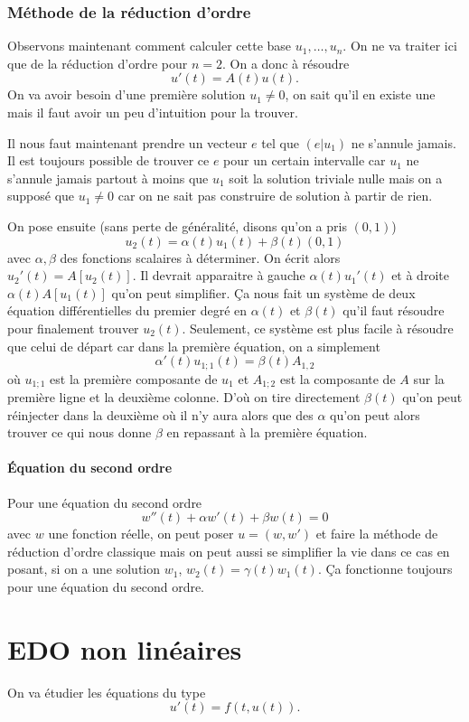 \subsubsection{Méthode de la réduction d'ordre}
\label{sec:redordre}
Observons maintenant comment calculer cette base $u_1,\ldots,u_n$.
On ne va traiter ici que de la réduction d'ordre pour $n=2$.
On a donc à résoudre
\[ u'(t) = A(t)u(t). \]
On va avoir besoin d'une première solution $u_1 \neq 0$,
on sait qu'il en existe une mais
il faut avoir un peu d'intuition pour la trouver.

Il nous faut maintenant prendre un vecteur $e$ tel que $(e|u_1)$
ne s'annule jamais.
Il est toujours possible de trouver ce $e$ pour un certain intervalle
car $u_1$ ne s'annule jamais partout à moins que
$u_1$ soit la solution triviale nulle mais on a supposé que $u_1 \neq 0$ car
on ne sait pas construire de solution à partir de rien.

On pose ensuite (sans perte de généralité, disons qu'on a pris $(0,1)$)
\[ u_2(t) = \alpha(t)u_1(t) + \beta(t)(0,1) \]
avec $\alpha,\beta$ des fonctions scalaires à déterminer.
On écrit alors $u_2'(t) = A[u_2(t)]$.
Il devrait apparaitre à gauche $\alpha(t) u_1'(t)$ et à droite
$\alpha(t) A[u_1(t)]$ qu'on peut simplifier.
Ça nous fait un système de deux équation différentielles du premier degré
en $\alpha(t)$ et $\beta(t)$ qu'il faut résoudre pour finalement trouver
$u_2(t)$.
Seulement, ce système est plus facile à résoudre que celui de départ
car dans la première équation, on a simplement
\[ \alpha'(t)u_{1;1}(t) = \beta(t)A_{1,2} \]
où $u_{1;1}$ est la première composante de $u_1$ et $A_{1;2}$ est
la composante de $A$ sur la première ligne et la deuxième colonne.
D'où on tire directement $\beta(t)$ qu'on peut réinjecter dans la deuxième
où il n'y aura alors que des $\alpha$ qu'on peut alors trouver ce qui nous
donne $\beta$ en repassant à la première équation.

\paragraph{Équation du second ordre}
Pour une équation du second ordre
\[ w''(t) + \alpha w'(t) + \beta w(t) = 0 \]
avec $w$ une fonction réelle,
on peut poser $u = (w,w')$ et faire la méthode de réduction d'ordre
classique mais on peut aussi se simplifier la vie dans ce cas en posant,
si on a une solution $w_1$,
$w_2(t) = \gamma(t) w_1(t)$.
Ça fonctionne toujours pour une équation du second ordre.

\section{EDO non linéaires}
On va étudier les équations du type
\[ u'(t) = f(t, u(t)). \]

